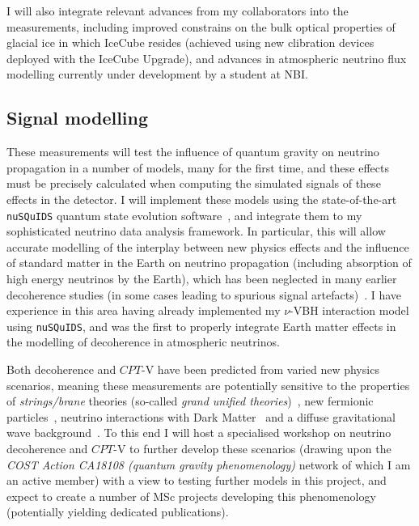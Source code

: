 \documentclass[a4paper,11pt]{article}
\begin{document}
I will also integrate relevant advances from my collaborators into the measurements, including improved constrains on the bulk optical properties of glacial ice in which IceCube resides (achieved using new clibration devices deployed with the IceCube Upgrade), and advances in atmospheric neutrino flux modelling currently under development by a student at NBI. \\


\subsection{Signal modelling}

These measurements will test the influence of quantum gravity on neutrino propagation in a number of models, many for the first time, and these effects must be precisely calculated when computing the simulated signals of these effects in the detector. I will implement these models using the state-of-the-art \texttt{nuSQuIDS} quantum state evolution software~\cite{Delgado:2014kpa, nusquidsGIT}, and integrate them to my sophisticated neutrino data analysis framework. In particular, this will allow accurate modelling of the interplay between new physics effects and the influence of standard matter in the Earth on neutrino propagation (including absorption of high energy neutrinos by the Earth), which has been neglected in many earlier decoherence studies (in some cases leading to spurious signal artefacts)~\cite{PhysRevD.97.115017}. I have experience in this area having already implemented my $\nu$-VBH interaction model using \texttt{nuSQuIDS}, and was the first to properly integrate Earth matter effects in the modelling of decoherence in atmospheric neutrinos.

Both decoherence and $CPT$-V have been predicted from varied new physics scenarios, meaning these measurements are potentially sensitive to the properties of \textit{strings/brane} theories (so-called \textit{grand unified theories})~\cite{Mavromatos2010, AmelinoCamelia:2008qg}, new fermionic particles~\cite{Hellmann:2021jyz}, neutrino interactions with Dark Matter~\cite{1909.11271, EPJC802020} and a diffuse gravitational wave background~\cite{PhysRevD.100.096014}.  To this end I will host a specialised workshop on neutrino decoherence and $CPT$-V to further develop these scenarios (drawing upon the \textit{COST Action CA18108 (quantum gravity phenomenology)} network of which I am an active member) with a view to testing further models in this project, and expect to create a number of MSc projects developing this phenomenology (potentially yielding dedicated publications).
\end{document}
